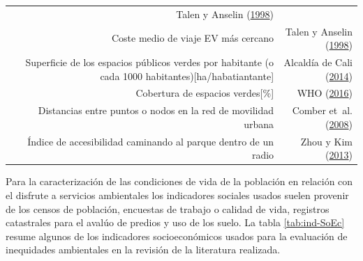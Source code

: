 \documentclass[12pt,a4paper,openany]{book}
\theoremstyle{definition}
\theoremstyle{definition}
\theoremstyle{definition}
\theoremstyle{remark}
\begin{document}
\begin{longtable}[]{@{}rr@{}}
\begin{minipage}[t]{0.31\columnwidth}
Talen y Anselin
(\protect\hyperlink{ref-talen_assessing_1998}{1998})\strut
\end{minipage}\tabularnewline
\begin{minipage}[t]{0.57\columnwidth}\raggedleft\strut
Coste medio de viaje EV más cercano\strut
\end{minipage} & \begin{minipage}[t]{0.31\columnwidth}\raggedleft\strut
Talen y Anselin
(\protect\hyperlink{ref-talen_assessing_1998}{1998})\strut
\end{minipage}\tabularnewline
\begin{minipage}[t]{0.57\columnwidth}\raggedleft\strut
Superficie de los espacios públicos verdes por habitante (o cada 1000
habitantes){[}ha/habatiantante{]}\strut
\end{minipage} & \begin{minipage}[t]{0.31\columnwidth}\raggedleft\strut
Alcaldía de Cali (\protect\hyperlink{ref-pot2014cali}{2014})\strut
\end{minipage}\tabularnewline
\begin{minipage}[t]{0.57\columnwidth}\raggedleft\strut
Cobertura de espacios verdes{[}\%{]}\strut
\end{minipage} & \begin{minipage}[t]{0.31\columnwidth}\raggedleft\strut
WHO (\protect\hyperlink{ref-who2016urban}{2016})\strut
\end{minipage}\tabularnewline
\begin{minipage}[t]{0.57\columnwidth}\raggedleft\strut
Distancias entre puntos o nodos en la red de movilidad urbana\strut
\end{minipage} & \begin{minipage}[t]{0.31\columnwidth}\raggedleft\strut
Comber et~al. (\protect\hyperlink{ref-comber_using_2008}{2008})\strut
\end{minipage}\tabularnewline
\begin{minipage}[t]{0.57\columnwidth}\raggedleft\strut
Índice de accesibilidad caminando al parque dentro de un radio\strut
\end{minipage} & \begin{minipage}[t]{0.31\columnwidth}\raggedleft\strut
Zhou y Kim (\protect\hyperlink{ref-zhou_social_2013}{2013})\strut
\end{minipage}\tabularnewline
\bottomrule
\end{longtable}

Para la caracterización de las condiciones de vida de la población en
relación con el disfrute a servicios ambientales los indicadores
sociales usados suelen provenir de los censos de población, encuestas de
trabajo o calidad de vida, registros catastrales para el avalúo de
predios y uso de los suelo. La tabla \ref{tab:ind-SoEc} resume algunos
de los indicadores socioeconómicos usados para la evaluación de
inequidades ambientales en la revisión de la literatura realizada.
\end{document}
